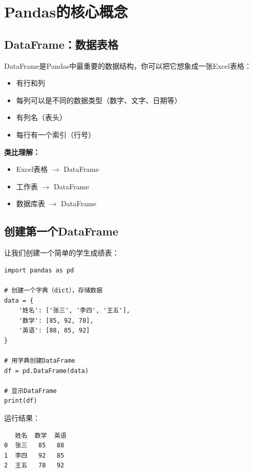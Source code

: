 \documentclass[12pt,a4paper]{article}
\begin{document}
\section{Pandas的核心概念}

\subsection{DataFrame：数据表格}

\begin{knowledgebox}
DataFrame是Pandas中最重要的数据结构，你可以把它想象成一张Excel表格：

\begin{itemize}
    \item 有行和列
    \item 每列可以是不同的数据类型（数字、文字、日期等）
    \item 有列名（表头）
    \item 每行有一个索引（行号）
\end{itemize}

\textbf{类比理解：}
\begin{itemize}
    \item Excel表格 $\rightarrow$ DataFrame
    \item 工作表 $\rightarrow$ DataFrame
    \item 数据库表 $\rightarrow$ DataFrame
\end{itemize}
\end{knowledgebox}

\subsection{创建第一个DataFrame}

让我们创建一个简单的学生成绩表：

\begin{lstlisting}[caption={创建DataFrame}]
import pandas as pd

# 创建一个字典（dict），存储数据
data = {
    '姓名': ['张三', '李四', '王五'],
    '数学': [85, 92, 78],
    '英语': [88, 85, 92]
}

# 用字典创建DataFrame
df = pd.DataFrame(data)

# 显示DataFrame
print(df)
\end{lstlisting}

运行结果：
\begin{verbatim}
   姓名  数学  英语
0  张三   85   88
1  李四   92   85
2  王五   78   92
\end{verbatim}
\end{document}
